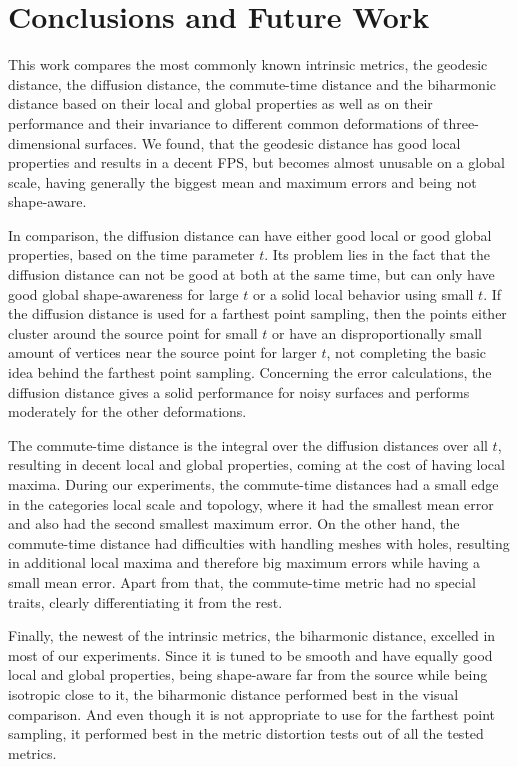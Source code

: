 \chapter{Conclusions and Future Work}
\label{chapter:conclusions}

This work compares the most commonly known intrinsic metrics, the geodesic distance, the diffusion distance, the commute-time distance and the biharmonic distance based on their local and global properties as well as on their performance and their invariance to different common deformations of three-dimensional surfaces.
We found, that the geodesic distance has good local properties and results in a decent FPS, but becomes almost unusable on a global scale, having generally the biggest mean and maximum errors and being not shape-aware.

In comparison, the diffusion distance can have either good local or good global properties, based on the time parameter $t$.
Its problem lies in the fact that the diffusion distance can not be good at both at the same time, but can only have good global shape-awareness for large $t$ or  a solid local behavior using small $t$.
If the diffusion distance is used for a farthest point sampling, then the points either cluster around the source point for small $t$ or have an disproportionally small amount of vertices near the source point for larger $t$, not completing the basic idea behind the farthest point sampling.
Concerning the error calculations, the diffusion distance gives a solid performance for noisy surfaces and performs moderately for the other deformations.

The commute-time distance is the integral over the diffusion distances over all $t$, resulting in decent local and global properties, coming at the cost of having local maxima.
During our experiments, the commute-time distances had a small edge in the categories local scale and topology, where it had the smallest mean error and also had the second smallest maximum error.
On the other hand, the commute-time distance had difficulties with handling meshes with holes, resulting in additional local maxima and therefore big maximum errors while having a small mean error.
Apart from that, the commute-time metric had no special traits, clearly differentiating it from the rest.

Finally, the newest of the intrinsic metrics, the biharmonic distance, excelled in most of our experiments.
Since it is tuned to be smooth and have equally good local and global properties, being shape-aware far from the source while being isotropic close to it, the biharmonic distance performed best in the visual comparison.
And even though it is not appropriate to use for the farthest point sampling, it performed best in the metric distortion tests out of all the tested metrics.

